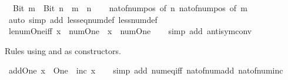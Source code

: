 \begin{isabellebody}
\ \ {\isachardoublequoteopen}Bit{}\ m\ {\isacharless}{\kern0pt}\ Bit{}\ n\ {\isasymlongleftrightarrow}\ m\ {\isacharless}{\kern0pt}\ n{\isachardoublequoteclose}\isanewline
%
\isadelimproof
\ \ %
\endisadelimproof
%
\isatagproof
{}\isamarkupfalse%
\ nat{\isacharunderscore}{\kern0pt}of{\isacharunderscore}{\kern0pt}num{\isacharunderscore}{\kern0pt}pos\ {\isacharbrackleft}{\kern0pt}of\ n{\isacharbrackright}{\kern0pt}\ nat{\isacharunderscore}{\kern0pt}of{\isacharunderscore}{\kern0pt}num{\isacharunderscore}{\kern0pt}pos\ {\isacharbrackleft}{\kern0pt}of\ m{\isacharbrackright}{\kern0pt}\isanewline
\ \ \isamarkupfalse%
\ {\isacharparenleft}{\kern0pt}auto\ simp\ add{\isacharcolon}{\kern0pt}\ less{\isacharunderscore}{\kern0pt}eq{\isacharunderscore}{\kern0pt}num{\isacharunderscore}{\kern0pt}def\ less{\isacharunderscore}{\kern0pt}num{\isacharunderscore}{\kern0pt}def{\isacharparenright}{\kern0pt}%
\endisatagproof
{\isafoldproof}%
%
\isadelimproof
\isanewline
%
\endisadelimproof
\isanewline
{}\isamarkupfalse%
\ le{\isacharunderscore}{\kern0pt}num{\isacharunderscore}{\kern0pt}One{\isacharunderscore}{\kern0pt}iff{\isacharcolon}{\kern0pt}\ {\isachardoublequoteopen}x\ {\isasymle}\ num{\isachardot}{\kern0pt}One\ {\isasymlongleftrightarrow}\ x\ {\isacharequal}{\kern0pt}\ num{\isachardot}{\kern0pt}One{\isachardoublequoteclose}\isanewline
%
\isadelimproof
\ \ %
\endisadelimproof
%
\isatagproof
{}\isamarkupfalse%
\ {\isacharparenleft}{\kern0pt}simp\ add{\isacharcolon}{\kern0pt}\ antisym{\isacharunderscore}{\kern0pt}conv{\isacharparenright}{\kern0pt}%
\endisatagproof
{\isafoldproof}%
%
\isadelimproof
%
\endisadelimproof
%
\begin{isamarkuptext}%
Rules using  and  as constructors.%
\end{isamarkuptext}\isamarkuptrue%
\isamarkupfalse%
\ add{\isacharunderscore}{\kern0pt}One{\isacharcolon}{\kern0pt}\ {\isachardoublequoteopen}x\ {\isacharplus}{\kern0pt}\ One\ {\isacharequal}{\kern0pt}\ inc\ x{\isachardoublequoteclose}\isanewline
%
\isadelimproof
\ \ %
\endisadelimproof
%
\isatagproof
{}\isamarkupfalse%
\ {\isacharparenleft}{\kern0pt}simp\ add{\isacharcolon}{\kern0pt}\ num{\isacharunderscore}{\kern0pt}eq{\isacharunderscore}{\kern0pt}iff\ nat{\isacharunderscore}{\kern0pt}of{\isacharunderscore}{\kern0pt}num{\isacharunderscore}{\kern0pt}add\ nat{\isacharunderscore}{\kern0pt}of{\isacharunderscore}{\kern0pt}num{\isacharunderscore}{\kern0pt}inc{\isacharparenright}{\kern0pt}%
\endisatagproof

\end{isabellebody}
